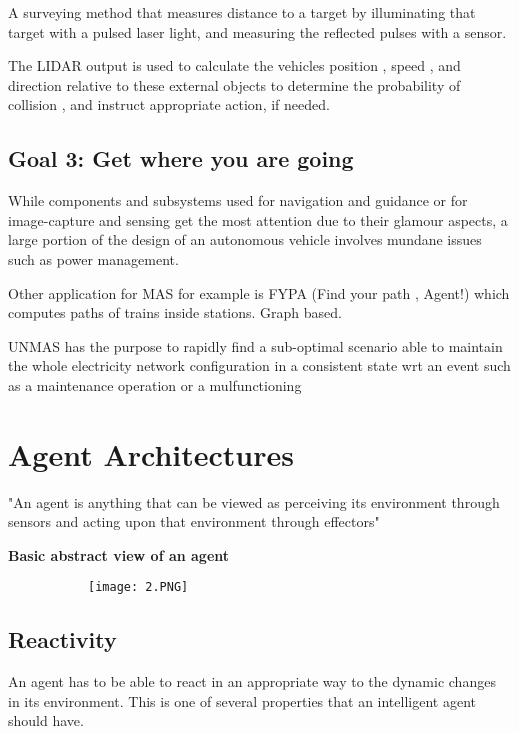 \documentclass{article}
\begin{document}
A surveying method that measures distance to a target by
illuminating that target with a pulsed laser light, and
measuring the reflected pulses with a sensor.

The LIDAR output is used to calculate the vehicles position , speed , and direction relative to these external objects to determine the probability of collision , and instruct appropriate action, if needed.


\subsection{Goal 3: Get where you are going}

While components and subsystems used for navigation
and guidance or for image-capture and sensing get the
most attention due to their glamour aspects, a large
portion of the design of an autonomous vehicle involves
mundane issues such as power management.

Other application for MAS for example is FYPA (Find your path , Agent!) which computes paths of trains inside stations. Graph based. 

UNMAS has the purpose to rapidly find a sub-optimal scenario able to maintain the whole electricity network configuration in a consistent state wrt an event such as a maintenance operation or a mulfunctioning





\section{Agent Architectures}

"An agent is anything that can be viewed as perceiving its environment through sensors and acting upon that environment through effectors"

\textbf{Basic abstract view of an agent}

\begin{figure}[ht!]
  \centering
  \begin{subfigure}[b]{0.4\linewidth}
    \texttt{[image: 2.PNG]}
  \end{subfigure}
\end{figure}


\subsection{Reactivity}

An agent has to be able to react in an appropriate way to the dynamic changes in its environment.
This is one of several properties that an intelligent agent should have.
\end{document}
